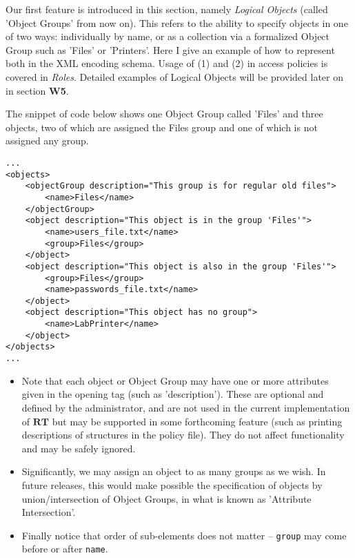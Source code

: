 \documentclass{article}
\providecommand{\tightlist}{
    \setlength{\itemsep}{1pt}\setlength{\parskip}{0pt}
}
\providecommand{\inlinecode}{\texttt}
\providecommand{\RT}{\textbf{RT}}
\begin{document}
Our first feature is introduced in this section, namely \textit{Logical Objects} (called 'Object Groups' from now on).
This refers to the ability to specify objects in one of two ways: individually by name, or as a collection via a formalized Object Group such as 'Files' or 'Printers'.
Here I give an example of how to represent both in the XML encoding schema.
Usage of (1) and (2) in access policies is covered in \textit{Roles}.
Detailed examples of Logical Objects will be provided later on in section \textbf{W5}.

The snippet of code below shows one Object Group called 'Files' and three objects, two of which are assigned the Files group and one of which is not assigned any group.
\begin{lstlisting}
...
<objects>
    <objectGroup description="This group is for regular old files">
        <name>Files</name>
    </objectGroup>
    <object description="This object is in the group 'Files'">
        <name>users_file.txt</name>
        <group>Files</group>
    </object>
    <object description="This object is also in the group 'Files'">
        <group>Files</group>
        <name>passwords_file.txt</name>
    </object>
    <object description="This object has no group">
        <name>LabPrinter</name>
    </object>
</objects>
...
\end{lstlisting}
\begin{itemize}\tightlist
  \item Note that each object or Object Group may have one or more attributes given in the opening tag (such as 'description'). These are optional and defined by the administrator, and are not used in the current implementation of $\RT$ but may be supported in some forthcoming feature (such as printing descriptions of structures in the policy file). They do not affect functionality and may be safely ignored.
  \item Significantly, we may assign an object to as many groups as we wish. In future releases, this would make possible the specification of objects by union/intersection of Object Groups, in what is known as 'Attribute Intersection'.
  \item Finally notice that order of sub-elements does not matter -- \inlinecode{group} may come before or after \inlinecode{name}.
\end{itemize}
\end{document}
